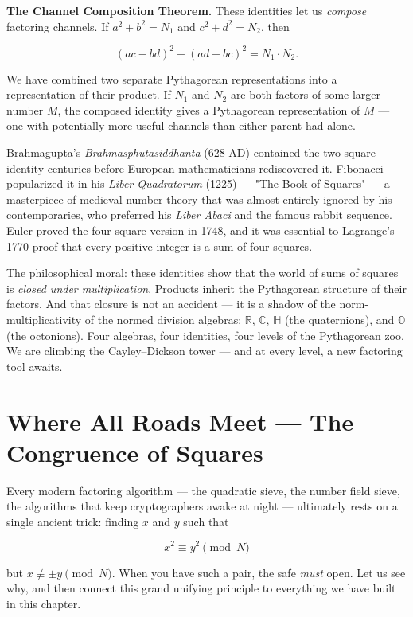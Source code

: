 \documentclass[11pt,twoside,openright]{book}
\theoremstyle{definition}
\theoremstyle{remark}
\begin{document}
\textbf{The Channel Composition Theorem.} These identities let us \textit{compose} factoring channels. If $a^2 + b^2 = N_1$ and $c^2 + d^2 = N_2$, then

\[(ac - bd)^2 + (ad + bc)^2 = N_1 \cdot N_2.\]

We have combined two separate Pythagorean representations into a representation of their product. If $N_1$ and $N_2$ are both factors of some larger number $M$, the composed identity gives a Pythagorean representation of $M$ --- one with potentially more useful channels than either parent had alone.



Brahmagupta's \textit{Brāhmasphuṭasiddhānta} (628 AD) contained the two-square identity centuries before European mathematicians rediscovered it. Fibonacci popularized it in his \textit{Liber Quadratorum} (1225) --- "The Book of Squares" --- a masterpiece of medieval number theory that was almost entirely ignored by his contemporaries, who preferred his \textit{Liber Abaci} and the famous rabbit sequence. Euler proved the four-square version in 1748, and it was essential to Lagrange's 1770 proof that every positive integer is a sum of four squares.

The philosophical moral: these identities show that the world of sums of squares is \textit{closed under multiplication}. Products inherit the Pythagorean structure of their factors. And that closure is not an accident --- it is a shadow of the norm-multiplicativity of the normed division algebras: $\mathbb{R}$, $\mathbb{C}$, $\mathbb{H}$ (the quaternions), and $\mathbb{O}$ (the octonions). Four algebras, four identities, four levels of the Pythagorean zoo. We are climbing the Cayley--Dickson tower --- and at every level, a new factoring tool awaits.


\section{Where All Roads Meet --- The Congruence of Squares}

Every modern factoring algorithm --- the quadratic sieve, the number field sieve, the algorithms that keep cryptographers awake at night --- ultimately rests on a single ancient trick: finding $x$ and $y$ such that

\[x^2 \equiv y^2 \pmod{N}\]

but $x \not\equiv \pm y \pmod{N}$. When you have such a pair, the safe \textit{must} open. Let us see why, and then connect this grand unifying principle to everything we have built in this chapter.
\end{document}
